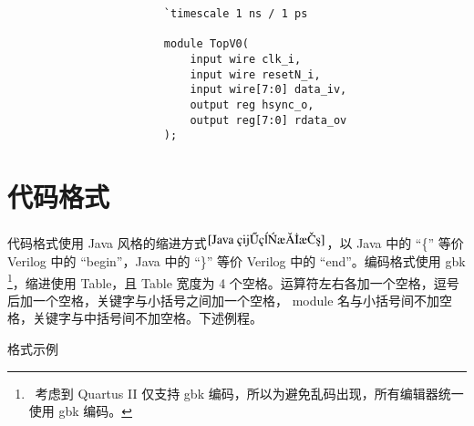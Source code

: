 \documentclass[utf-8, 10pt, a4paper, titlepage, oneside, onecolumn, openany]{ctexart} %
\begin{document}
\begin{enumerate}
				\begin{shaded}
					\begin{verbatim}
						`timescale 1 ns / 1 ps
						
						module TopV0(
							input wire clk_i,
							input wire resetN_i,
							input wire[7:0] data_iv,
							output reg hsync_o,
							output reg[7:0] rdata_ov
						);
					\end{verbatim}
				\end{shaded}

		\end{enumerate}

	\clearpage

	\section{代码格式}
		代码格式使用 Java 风格的缩进方式$^{\cite{Java 编程思想}}$，以 Java 中的 “\{” 等价 Verilog 中的 “begin”，Java 中的 “\}” 等价 Verilog 中的 “end”。编码格式使用 gbk \footnote{~考虑到 Quartus II 仅支持 gbk 编码，所以为避免乱码出现，所有编辑器统一使用 gbk 编码。}，缩进使用 Table，且 Table 宽度为 4 个空格。运算符左右各加一个空格，逗号后加一个空格，关键字与小括号之间加一个空格， module 名与小括号间不加空格，关键字与中括号间不加空格。下述例程。
		
		\begin{table}[h]
			\caption{格式示例} \label{格式示例}
		\end{table}
		
\end{document}
